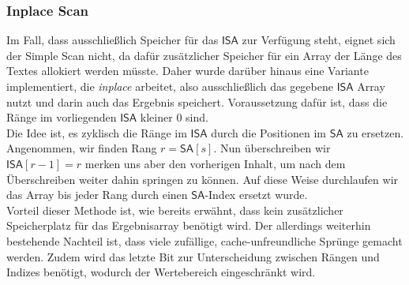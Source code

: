 \subsubsection{Inplace Scan}
Im Fall, dass ausschließlich Speicher für das $\mathsf{ISA}$ zur Verfügung steht, eignet sich der Simple Scan nicht, da dafür zusätzlicher Speicher für ein Array der Länge des Textes allokiert werden müsste. Daher wurde darüber hinaus eine Variante implementiert, die \textit{inplace} arbeitet, also ausschließlich das gegebene $\mathsf{ISA}$ Array nutzt und darin auch das Ergebnis speichert. Voraussetzung dafür ist, dass die Ränge im vorliegenden $\mathsf{ISA}$ kleiner $0$ sind.\\
Die Idee ist, es zyklisch die Ränge im $\mathsf{ISA}$ durch die Positionen im $\mathsf{SA}$ zu ersetzen. Angenommen, wir finden Rang $r = \mathsf{SA}[s]$. Nun überschreiben wir $\mathsf{ISA}[r-1]=r$ merken uns aber den vorherigen Inhalt, um nach dem Überschreiben weiter dahin springen zu können. Auf diese Weise durchlaufen wir das Array bis jeder Rang durch einen $\mathsf{SA}$-Index ersetzt wurde.\\
Vorteil dieser Methode ist, wie bereits erwähnt, dass kein zusätzlicher Speicherplatz für das Ergebnisarray benötigt wird. Der allerdings weiterhin bestehende Nachteil ist, dass viele zufällige, cache-unfreundliche Sprünge gemacht werden. Zudem wird das letzte Bit zur Unterscheidung zwischen Rängen und Indizes benötigt, wodurch der Wertebereich eingeschränkt wird.
